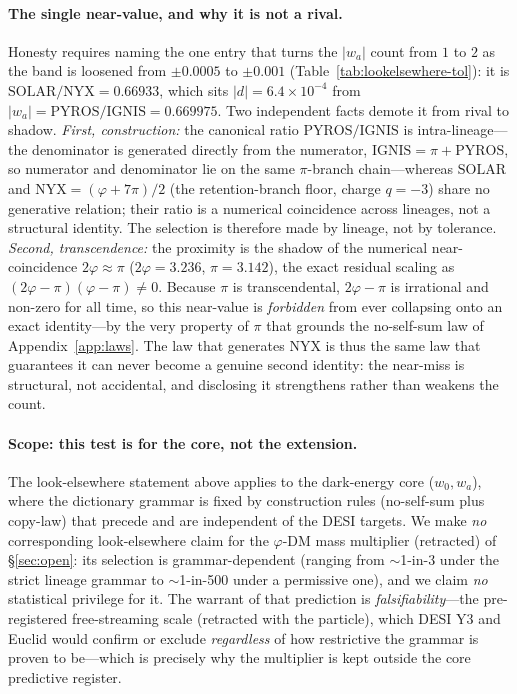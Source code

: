 \documentclass[aps,prd,preprint,amsmath,amssymb,nofootinbib,longbibliography]{revtex4-2}
\begin{document}
\paragraph{The single near-value, and why it is not a rival.} Honesty requires
naming the one entry that turns the $|w_a|$ count from $1$ to $2$ as the band is
loosened from $\pm0.0005$ to $\pm0.001$ (Table~\ref{tab:lookelsewhere-tol}): it is
$\mathrm{SOLAR}/\mathrm{NYX}=0.66933$, which sits $|d|=6.4\times10^{-4}$ from
$|w_a|=\mathrm{PYROS}/\mathrm{IGNIS}=0.669975$. Two independent facts demote it from
rival to shadow. \emph{First, construction:} the canonical ratio
$\mathrm{PYROS}/\mathrm{IGNIS}$ is intra-lineage---the denominator is generated
directly from the numerator, $\mathrm{IGNIS}=\pi+\mathrm{PYROS}$, so numerator and
denominator lie on the same $\pi$-branch chain---whereas $\mathrm{SOLAR}$ and
$\mathrm{NYX}=(\varphi+7\pi)/2$ (the retention-branch floor, charge $q=-3$) share
no generative relation; their ratio is a numerical coincidence across lineages, not a
structural identity. The selection is therefore made by lineage, not by tolerance. \emph{Second, transcendence:} the
proximity is the shadow of the numerical near-coincidence $2\varphi\approx\pi$
($2\varphi=3.236$, $\pi=3.142$), the exact residual scaling as
$(2\varphi-\pi)(\varphi-\pi)\neq0$. Because $\pi$ is transcendental, $2\varphi-\pi$
is irrational and non-zero for all time, so this near-value is \emph{forbidden}
from ever collapsing onto an exact identity---by the very property of $\pi$ that
grounds the no-self-sum law of Appendix~\ref{app:laws}. The law that generates
$\mathrm{NYX}$ is thus the same law that guarantees it can never become a genuine
second identity: the near-miss is structural, not accidental, and disclosing it
strengthens rather than weakens the count.

\paragraph{Scope: this test is for the core, not the extension.} The
look-elsewhere statement above applies to the dark-energy core ($w_0,w_a$),
where the dictionary grammar is fixed by construction rules (no-self-sum plus
copy-law) that precede and are independent of the DESI targets. We make
\emph{no} corresponding look-elsewhere claim for the $\varphi$-DM mass
multiplier (retracted) of
\S\ref{sec:open}: its selection is grammar-dependent (ranging from
$\sim$1-in-3 under the strict lineage grammar to $\sim$1-in-500 under a
permissive one), and we claim \emph{no} statistical privilege for it. The
warrant of that prediction is \emph{falsifiability}---the pre-registered
free-streaming scale (retracted with the particle), which DESI Y3 and Euclid would
confirm or exclude \emph{regardless} of how restrictive the grammar is proven
to be---which is precisely why the multiplier is kept outside the core
predictive register.
\end{document}
